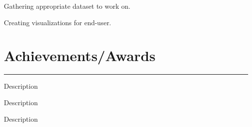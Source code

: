 \documentclass[]{puneet-resume}
\begin{document}
\begin{minipage}[t]{0.66\textwidth}
 
\noindent
\hspace{5em}%
\begin{tightemize}
\begin{minipage}{0.85\textwidth\vspace{2pt}}
	\item Gathering appropriate dataset to work on.
	\item Creating visualizations for end-user.
\end{minipage}
\end{tightemize}
\sectionsep
\section{Achievements/Awards} 
\noindent\rule{12.5cm}{0.4pt}
 
\noindent
\hspace{5em}%
\begin{minipage}{0.85\textwidth\vspace{2pt}}
Description
\end{minipage}
 
\noindent
\hspace{5em}%
\begin{minipage}{0.85\textwidth\vspace{2pt}}
Description
\end{minipage}
 
\noindent
\hspace{5em}%
\begin{minipage}{0.85\textwidth\vspace{2pt}}
Description
\end{minipage}

\end{minipage}
\end{document}

